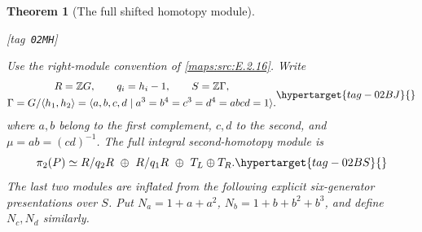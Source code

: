 \documentclass[11pt,a4paper]{article}
\numberwithin{equation}{section}
\newtheorem{theorem}{Theorem}[section]
\theoremstyle{definition}
\newcommand{\StatementRecord}[4]{{\upshape\footnotesize[tag~\texttt{#3}]}\enspace\ignorespaces}
\begin{document}
\begin{theorem}[The full shifted homotopy module]\hypertarget{tag-02MH}{}\label{maps:src:E.2.17}
\StatementRecord{maps:src:E.2.17}{proved}{02MH}{\cref{maps:src:E.2.16}, \cref{maps:src:E.2.13}, \eqref{maps:eq:E.P7}, \eqref{maps:eq:E.P8}, \eqref{maps:eq:E.P11}, \cref{maps:src:E.2.9}, \cref{maps:src:E.2.10}, \eqref{maps:eq:E.P9}, \eqref{maps:eq:E.P14}, \eqref{maps:eq:E.P16}, \cref{maps:src:E.2.11}}


Use the right-module convention of \ref{maps:src:E.2.16}. Write
\begin{equation}
 \begin{gathered}
 R=\mathbb ZG,\qquad q_i=h_i-1,\qquad S=\mathbb Z\Gamma,\\
 \Gamma=G/\langle h_1,h_2\rangle
  =\langle a,b,c,d\mid a^3=b^4=c^3=d^4=abcd=1\rangle.
 \end{gathered}
 \hypertarget{tag-02BJ}{}\label{maps:eq:E.P1}
\end{equation}
where $a,b$ belong to the first complement, $c,d$ to
the second, and $\mu=ab=(cd)^{-1}$. The full integral
second-homotopy module is
\begin{equation}
 \pi_2(P)\simeq R/q_2R\ \oplus\ R/q_1R
                    \ \oplus\ T_L\oplus T_R.
 \hypertarget{tag-02BS}{}\label{maps:eq:E.P2}
\end{equation}
The last two modules are inflated from the following
explicit six-generator presentations over $S$.
Put $N_a=1+a+a^2$, $N_b=1+b+b^2+b^3$, and define
$N_c,N_d$ similarly.


\end{theorem}
\end{document}
